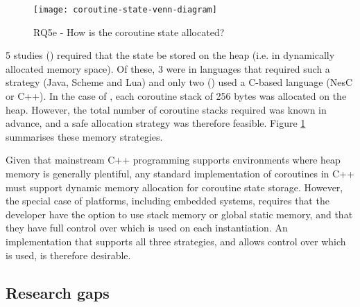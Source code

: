 \begin{figure}
	\texttt{[image: coroutine-state-venn-diagram]}
	\caption{RQ5e - How is the coroutine state allocated?}
	\label{fig:rq5e2}
\end{figure}

5 studies (\cite{Motika2015, St-Amour2010, Park2015, Cohen2007b, Kalebe2017}) required that the state be stored on the heap (i.e. in dynamically allocated memory space).  Of these, 3 were in languages that required such a strategy (Java, Scheme and Lua) and only two (\cite{Cohen2007b, Kalebe2017}) used a C-based language (NesC or C++). In the case of \cite{Cohen2007b}, each coroutine stack of 256 bytes was allocated on the heap. However, the total number of coroutine stacks required was known in advance, and a safe allocation strategy was therefore feasible. Figure \ref{fig:rq5e2} summarises these memory strategies.

Given that mainstream C++ programming supports environments where heap memory is generally plentiful, any standard implementation of coroutines in C++ must support dynamic memory allocation for coroutine state storage. However, the special case of \DIFdelbegin {}\DIFdelend \DIFaddbegin {}\DIFaddend platforms, including embedded systems, requires that the developer have the option to use stack memory or global static memory, and that they have full control over which is used on each instantiation. An implementation that supports all three strategies, and allows control over which is used, is therefore desirable.%

\subsection{Research gaps}

\newenvironment{vheader}
{ \begin{sideways}\centering\begin{tabular}{c} }
{ \end{tabular}\end{sideways} }


